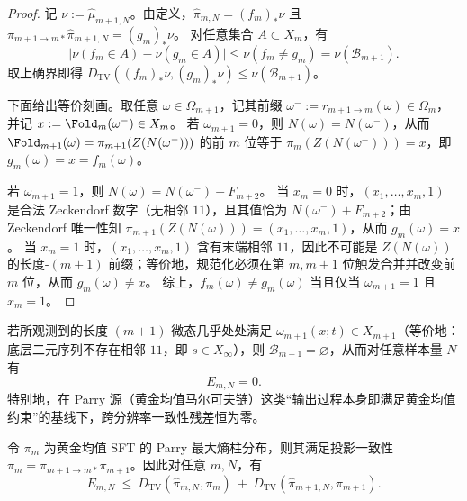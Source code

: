 \begin{proof}
记 $\nu:=\hat\mu_{m+1,N}$。由定义，$\hat\pi_{m,N}=(f_m)_*\nu$ 且 $\pi_{m+1\to m*}\hat\pi_{m+1,N}=(g_m)_*\nu$。
对任意集合 $A\subset X_m$，有
\[
\bigl|\nu(f_m\in A)-\nu(g_m\in A)\bigr|\le \nu(f_m\ne g_m)=\nu(\mathcal{B}_{m+1}).
\]
取上确界即得 $D_{\mathrm{TV}}((f_m)_*\nu,(g_m)_*\nu)\le \nu(\mathcal{B}_{m+1})$。

下面给出等价刻画。取任意 $\omega\in\Omega_{m+1}$，记其前缀 $\omega^-:=r_{m+1\to m}(\omega)\in\Omega_m$，并记 $x:=\Fold_m(\omega^-)\in X_m$。
若 $\omega_{m+1}=0$，则 $N(\omega)=N(\omega^-)$，从而
\(
\Fold_{m+1}(\omega)=\pi_{m+1}(Z(N(\omega^-)))
\)
的前 $m$ 位等于 $\pi_m(Z(N(\omega^-)))=x$，即 $g_m(\omega)=x=f_m(\omega)$。

若 $\omega_{m+1}=1$，则 $N(\omega)=N(\omega^-)+F_{m+2}$。
当 $x_m=0$ 时，$(x_1,\dots,x_m,1)$ 是合法 Zeckendorf 数字（无相邻 $11$），且其值恰为 $N(\omega^-)+F_{m+2}$；由 Zeckendorf 唯一性知
\(
\pi_{m+1}(Z(N(\omega)))=(x_1,\dots,x_m,1)
\)，从而 $g_m(\omega)=x$。
当 $x_m=1$ 时，$(x_1,\dots,x_m,1)$ 含有末端相邻 $11$，因此不可能是 $Z(N(\omega))$ 的长度-$(m{+}1)$ 前缀；等价地，规范化必须在第 $m,m{+}1$ 位触发合并并改变前 $m$ 位，从而 $g_m(\omega)\ne x$。
综上，$f_m(\omega)\ne g_m(\omega)$ 当且仅当 $\omega_{m+1}=1$ 且 $x_m=1$。
\end{proof}

\begin{corollary}\label{cor:multiscale-zero-stable}
若所观测到的长度-$(m{+}1)$ 微态几乎处处满足 $\omega_{m+1}(x;t)\in X_{m+1}$（等价地：底层二元序列不存在相邻 $11$，即 $s\in X_\infty$），则 $\mathcal{B}_{m+1}=\varnothing$，从而对任意样本量 $N$ 有
\[
E_{m,N}=0.
\]
特别地，在 Parry 源（黄金均值马尔可夫链）这类“输出过程本身即满足黄金均值约束”的基线下，跨分辨率一致性残差恒为零。
\end{corollary}

\begin{proposition}\label{prop:multiscale-residual-parry-bound}
令 \(\pi_m\) 为黄金均值 SFT 的 Parry 最大熵柱分布，则其满足投影一致性 \(\pi_m=\pi_{m+1\to m*}\pi_{m+1}\)。因此对任意 \(m,N\)，有
\[
E_{m,N}\ \le\ D_{\mathrm{TV}}(\hat{\pi}_{m,N},\pi_m)\ +\ D_{\mathrm{TV}}(\hat{\pi}_{m+1,N},\pi_{m+1}).
\]
\end{proposition}

